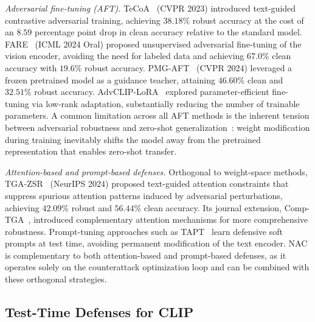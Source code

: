 \documentclass[12pt,a4paper]{article}
\begin{document}
\emph{Adversarial fine-tuning (AFT).} TeCoA~\cite{mao2023understanding} (CVPR 2023) introduced text-guided contrastive adversarial training, achieving $38.18\%$ robust accuracy at the cost of an $8.59$ percentage point drop in clean accuracy relative to the standard model. FARE~\cite{schlarmann2024robust} (ICML 2024 Oral) proposed unsupervised adversarial fine-tuning of the vision encoder, avoiding the need for labeled data and achieving $67.0\%$ clean accuracy with $19.6\%$ robust accuracy. PMG-AFT~\cite{xu2024pretrained} (CVPR 2024) leveraged a frozen pretrained model as a guidance teacher, attaining $46.60\%$ clean and $32.51\%$ robust accuracy. AdvCLIP-LoRA~\cite{chen2025advclip} explored parameter-efficient fine-tuning via low-rank adaptation, substantially reducing the number of trainable parameters. A common limitation across all AFT methods is the inherent tension between adversarial robustness and zero-shot generalization~\cite{gowal2021improving}: weight modification during training inevitably shifts the model away from the pretrained representation that enables zero-shot transfer.

\emph{Attention-based and prompt-based defenses.} Orthogonal to weight-space methods, TGA-ZSR~\cite{yu2024text} (NeurIPS 2024) proposed text-guided attention constraints that suppress spurious attention patterns induced by adversarial perturbations, achieving $42.09\%$ robust and $56.44\%$ clean accuracy. Its journal extension, Comp-TGA~\cite{yu2024text}, introduced complementary attention mechanisms for more comprehensive robustness. Prompt-tuning approaches such as TAPT~\cite{wang2025tapt} learn defensive soft prompts at test time, avoiding permanent modification of the text encoder. NAC is complementary to both attention-based and prompt-based defenses, as it operates solely on the counterattack optimization loop and can be combined with these orthogonal strategies.

\subsection{Test-Time Defenses for CLIP}
\end{document}
